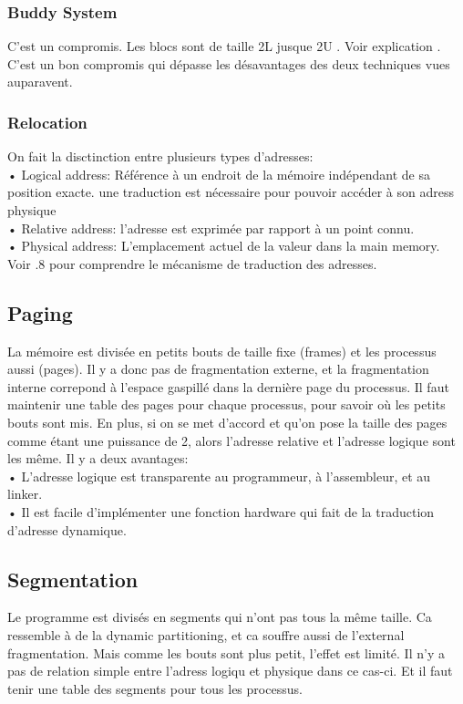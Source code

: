 \subsubsection{Buddy System}
C'est un compromis.
Les blocs sont de taille 2L jusque 2U .
Voir explication \cite[p.~317]{stallings}.
C'est un bon compromis qui dépasse les désavantages des deux techniques vues auparavent.
\subsubsection{Relocation}
On fait la disctinction entre plusieurs types d'adresses: \\
• Logical address: Référence à un endroit de la mémoire indépendant de sa position exacte.
une traduction est nécessaire pour pouvoir accéder à son adress physique \\
• Relative address: l'adresse est exprimée par rapport à un point connu.
\\
• Physical address: L'emplacement actuel de la valeur dans la main memory.
Voir \cite[p.~7]{stallings}.8 pour comprendre le mécanisme de traduction des adresses.
\subsection{Paging}
La mémoire est divisée en petits bouts de taille fixe (frames) et les processus aussi (pages).
Il y a donc pas de fragmentation externe, et la fragmentation interne correpond à l'espace gaspillé dans la dernière page du processus.
Il faut maintenir une table des pages pour chaque processus, pour savoir où les petits bouts sont mis.
En plus, si on se met d'accord et qu'on pose la taille des pages comme étant une puissance de 2, alors l'adresse relative et l'adresse logique sont les même.
Il y a deux avantages: \\
• L'adresse logique est transparente au programmeur, à l'assembleur, et au linker.
 \\
• Il est facile d'implémenter une fonction hardware qui fait de la traduction d'adresse
dynamique.
\subsection{Segmentation}
Le programme est divisés en segments qui n'ont pas tous la même taille.
Ca ressemble à de la dynamic partitioning, et ca souffre aussi de l'external fragmentation.
Mais comme les bouts sont plus petit, l'effet est limité.
Il n'y a pas de relation simple entre l'adress logiqu et physique dans ce cas-ci.
Et il faut tenir une table des segments pour tous les processus.
